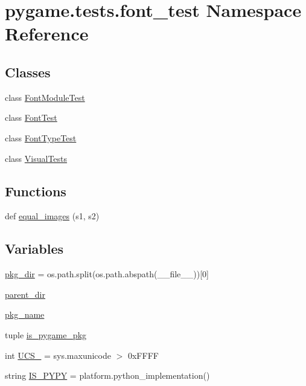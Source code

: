 \hypertarget{namespacepygame_1_1tests_1_1font__test}{}\section{pygame.\+tests.\+font\+\_\+test Namespace Reference}
\label{namespacepygame_1_1tests_1_1font__test}
\subsection*{Classes}
\begin{DoxyCompactItemize}
\item 
class \hyperlink{classpygame_1_1tests_1_1font__test_1_1_font_module_test}{Font\+Module\+Test}
\item 
class \hyperlink{classpygame_1_1tests_1_1font__test_1_1_font_test}{Font\+Test}
\item 
class \hyperlink{classpygame_1_1tests_1_1font__test_1_1_font_type_test}{Font\+Type\+Test}
\item 
class \hyperlink{classpygame_1_1tests_1_1font__test_1_1_visual_tests}{Visual\+Tests}
\end{DoxyCompactItemize}
\subsection*{Functions}
\begin{DoxyCompactItemize}
\item 
def \hyperlink{namespacepygame_1_1tests_1_1font__test_a5ba70d74451d248d84fbb9967b06fdc1}{equal\+\_\+images} (s1, s2)
\end{DoxyCompactItemize}
\subsection*{Variables}
\begin{DoxyCompactItemize}
\item 
\hyperlink{namespacepygame_1_1tests_1_1font__test_ab358e1a7b85d01d0296f81baea7d3b54}{pkg\+\_\+dir} = os.\+path.\+split(os.\+path.\+abspath(\+\_\+\+\_\+file\+\_\+\+\_\+))\mbox{[}0\mbox{]}
\item 
\hyperlink{namespacepygame_1_1tests_1_1font__test_a720308b4ce021f6263592239d193f583}{parent\+\_\+dir}
\item 
\hyperlink{namespacepygame_1_1tests_1_1font__test_ae0879307b7656afa28ac66cba56049ce}{pkg\+\_\+name}
\item 
tuple \hyperlink{namespacepygame_1_1tests_1_1font__test_a4c4a07b998a9843f2eb5ce4cc478eb5d}{is\+\_\+pygame\+\_\+pkg}
\item 
int \hyperlink{namespacepygame_1_1tests_1_1font__test_aa165c72a18c260b77ab2a3fee9a93dff}{U\+C\+S\+\_} = sys.\+maxunicode $>$ 0x\+F\+F\+FF
\item 
string \hyperlink{namespacepygame_1_1tests_1_1font__test_a4a4799981d9cdb270088dd52f8813c04}{I\+S\+\_\+\+P\+Y\+PY} = platform.\+python\+\_\+implementation()
\end{DoxyCompactItemize}


